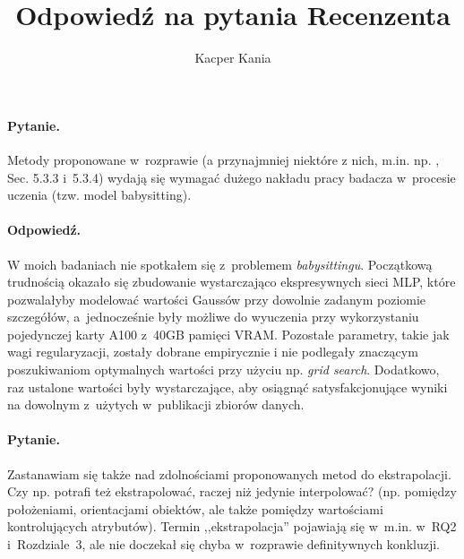 \documentclass{rebuttal}
\title{Odpowiedź na pytania Recenzenta}
\author{Kacper Kania}
\date{}
\begin{document}
\maketitle

\responsedelimiter

\paragraph{Pytanie.}
  Metody proponowane w~rozprawie (a przynajmniej niektóre z nich, m.in. np.
  \clog, Sec. 5.3.3 i~5.3.4) wydają się wymagać dużego nakładu pracy badacza
  w~procesie uczenia (tzw. model babysitting).

\paragraph{Odpowiedź.}
  W moich badaniach nie spotkałem się z~problemem \textit{babysittingu}.
  Początkową trudnością okazało się zbudowanie wystarczająco ekspresywnych sieci
  MLP, które pozwalałyby modelować wartości Gaussów przy dowolnie zadanym
  poziomie szczegółów, a~jednocześnie były możliwe do wyuczenia przy
  wykorzystaniu pojedynczej karty A100 z~40GB pamięci VRAM. Pozostałe parametry,
  takie jak wagi regularyzacji, zostały dobrane empirycznie i nie podlegały
  znaczącym poszukiwaniom optymalnych wartości przy użyciu np. \textit{grid
    search}. Dodatkowo, raz ustalone wartości były wystarczające, aby osiągnąć
  satysfakcjonujące wyniki na dowolnym z~użytych w~publikacji zbiorów danych.

  \responsedelimiter

\paragraph{Pytanie.}
  Zastanawiam się także nad zdolnościami proponowanych metod do ekstrapolacji.
  Czy np. \conerf potrafi też ekstrapolować, raczej niż jedynie interpolować?
  (np. pomiędzy położeniami, orientacjami obiektów, ale także pomiędzy
  wartościami kontrolujących atrybutów). Termin ,,ekstrapolacja'' pojawiają się
  w~m.in. w~RQ2 i~Rozdziale~3, ale nie doczekał się chyba w~rozprawie
  definitywnych konkluzji.
\end{document}

